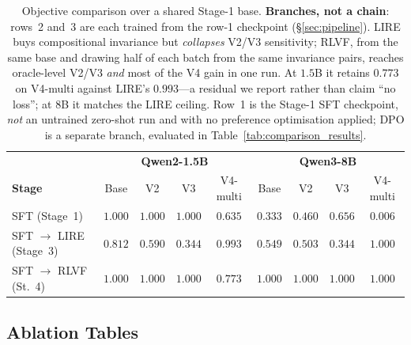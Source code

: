 \documentclass{article}
\begin{document}
\begin{table}[h]
\centering\small
\caption{Objective comparison over a shared Stage-1 base. \textbf{Branches, not a chain}: rows~2 and~3 are each trained from the row-1 checkpoint (\S\ref{sec:pipeline}). LIRE buys compositional invariance but \emph{collapses} V2/V3 sensitivity; \textsc{RLVF}, from the same base and drawing half of each batch from the same invariance pairs, reaches oracle-level V2/V3 \emph{and} most of the V4 gain in one run. At $1.5$B it retains $0.773$ on V4-multi against LIRE's $0.993$---a residual we report rather than claim ``no loss''; at $8$B it matches the LIRE ceiling. Row~1 is the Stage-1 SFT checkpoint, \emph{not} an untrained zero-shot run and with no preference optimisation applied; DPO is a separate branch, evaluated in Table~\ref{tab:comparison_results}.}
\label{tab:stage_wise}
\begin{tabular}{l|cccc|cccc}
\toprule
& \multicolumn{4}{c|}{\textbf{Qwen2-1.5B}} & \multicolumn{4}{c}{\textbf{Qwen3-8B}} \\
\textbf{Stage}            & Base & V2   & V3   & V4-multi & Base & V2   & V3   & V4-multi \\
\midrule
SFT (Stage~1)             & $1.000$ & $1.000$ & $1.000$ & $0.635$  & $0.333$ & $0.460$ & $0.656$ & $0.006$  \\
SFT $\to$ LIRE (Stage~3)  & $0.812$ & $0.590$ & $0.344$ & $\mathbf{0.993}$ & $0.549$ & $0.503$ & $0.344$ & $\mathbf{1.000}$ \\
SFT $\to$ \textsc{RLVF} (St.~4) & $\mathbf{1.000}$ & $\mathbf{1.000}$ & $\mathbf{1.000}$ & $0.773$ & $\mathbf{1.000}$ & $\mathbf{1.000}$ & $\mathbf{1.000}$ & $\mathbf{1.000}$ \\
\bottomrule
\end{tabular}
\end{table}

\subsection{Ablation Tables}
\label{app:ablation}
\end{document}
